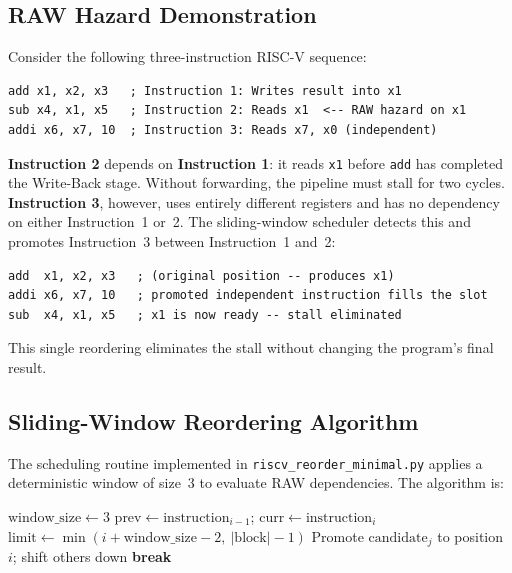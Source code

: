 \documentclass[11pt]{report}
\begin{document}
\subsection{RAW Hazard Demonstration}

Consider the following three-instruction RISC-V sequence:

\begin{verbatim}
add x1, x2, x3   ; Instruction 1: Writes result into x1
sub x4, x1, x5   ; Instruction 2: Reads x1  <-- RAW hazard on x1
addi x6, x7, 10  ; Instruction 3: Reads x7, x0 (independent)
\end{verbatim}

\textbf{Instruction 2} depends on \textbf{Instruction 1}: it reads \texttt{x1} before \texttt{add} has completed the Write-Back stage. Without forwarding, the pipeline must stall for two cycles. \textbf{Instruction 3}, however, uses entirely different registers and has no dependency on either Instruction~1 or~2. The sliding-window scheduler detects this and promotes Instruction~3 between Instruction~1 and~2:

\begin{verbatim}
add  x1, x2, x3   ; (original position -- produces x1)
addi x6, x7, 10   ; promoted independent instruction fills the slot
sub  x4, x1, x5   ; x1 is now ready -- stall eliminated
\end{verbatim}

This single reordering eliminates the stall without changing the program's final result.

\subsection{Sliding-Window Reordering Algorithm}

The scheduling routine implemented in \texttt{riscv\_reorder\_minimal.py} applies a deterministic window of size~3 to evaluate RAW dependencies. The algorithm is:

\begin{algorithm}[H]
\caption{Window-3 RAW-Aware Reordering Algorithm}
\begin{algorithmic}[1]
\State $\text{window\_size} \gets 3$
    \State $\text{prev} \gets \text{instruction}_{i-1}$; \quad $\text{curr} \gets \text{instruction}_{i}$
        \State $\text{limit} \gets \min(i + \text{window\_size} - 2,\ |\text{block}| - 1)$
                \State Promote $\text{candidate}_{j}$ to position $i$; shift others down
                \State \textbf{break}
            \EndIf
        \EndFor
    \EndIf
\EndFor
\end{algorithmic}
\end{algorithm}
\end{document}

